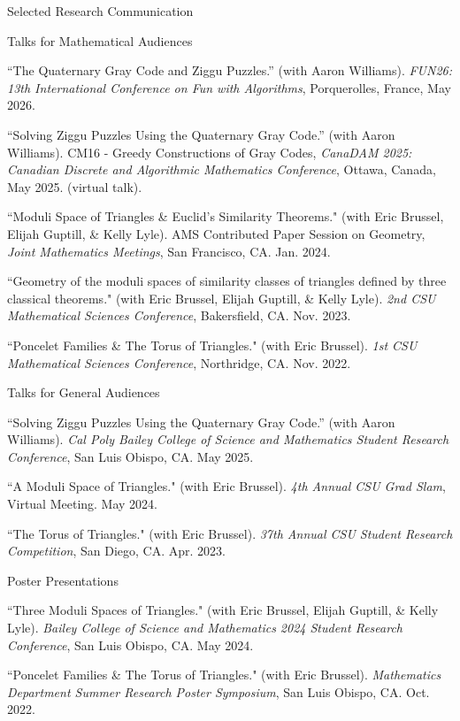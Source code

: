 \documentclass[
	11pt, %
]{cv} %
\begin{document}
\begin{rSection}{Selected Research Communication}

	\begin{rSubsectionNumbered}{Talks for Mathematical Audiences}
		\item ``The Quaternary Gray Code and Ziggu Puzzles.'' (with Aaron Williams). \textit{FUN26: 13th International Conference on Fun with Algorithms}, Porquerolles, France, May 2026.
		\item ``Solving Ziggu Puzzles Using the Quaternary Gray Code.'' (with Aaron Williams). CM16 - Greedy Constructions of Gray Codes, \textit{CanaDAM 2025: Canadian Discrete and Algorithmic Mathematics Conference}, Ottawa, Canada, May 2025. (virtual talk).
		\item ``Moduli Space of Triangles \& Euclid's Similarity Theorems." (with Eric Brussel, Elijah Guptill, \& Kelly Lyle). AMS Contributed Paper Session on Geometry, \textit{ Joint Mathematics Meetings},
		San Francisco, CA. Jan. 2024.
		\item ``Geometry of the moduli spaces of similarity classes of triangles defined by three classical theorems." (with Eric Brussel, Elijah Guptill, \& Kelly Lyle). \textit{ 2nd CSU Mathematical Sciences Conference},
		Bakersfield, CA. Nov. 2023.
		\item ``Poncelet Families \& The Torus of Triangles." (with Eric Brussel). \textit{1st CSU Mathematical Sciences Conference},
		Northridge, CA. Nov. 2022.
	\end{rSubsectionNumbered}
	\begin{rSubsectionNumbered}{Talks for General Audiences}
		\item ``Solving Ziggu Puzzles Using the Quaternary Gray Code.'' (with Aaron Williams). \textit{Cal Poly Bailey College of Science and Mathematics Student Research Conference}, San Luis Obispo, CA. May 2025.
		\item ``A Moduli Space of Triangles." (with Eric Brussel). \textit{4th Annual CSU Grad Slam},
		Virtual Meeting. May 2024.
		\item ``The Torus of Triangles." (with Eric Brussel). \textit{ 37th Annual CSU Student Research Competition},
		San Diego, CA. Apr. 2023.
	\end{rSubsectionNumbered}
	\begin{rSubsectionNumbered}{Poster Presentations}
		\item ``Three Moduli Spaces of Triangles." (with Eric Brussel, Elijah Guptill, \& Kelly Lyle).  \textit{Bailey College of Science and Mathematics 2024 Student Research Conference}, San Luis Obispo, CA. May 2024.
		\item ``Poncelet Families \& The Torus of Triangles." (with Eric Brussel). \textit{ Mathematics Department Summer Research Poster Symposium}, San Luis Obispo, CA. Oct. 2022.
	\end{rSubsectionNumbered}


\end{rSection}
\end{document}
